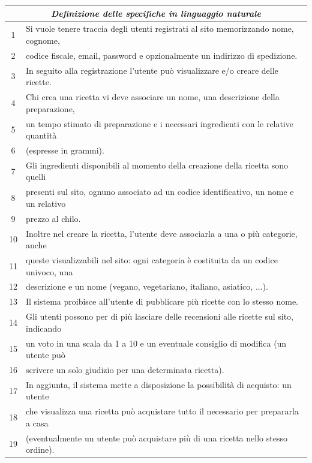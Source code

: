 \begin{table}[H]
\centering
\setlength{\extrarowheight}{2pt}
\begin{tabularx}{\textwidth}{|c|X|}
\hline
\multicolumn{2}{|c|}{\textit{\textbf{Definizione delle specifiche in linguaggio naturale}}} \\
\hline
1 & Si vuole tenere traccia degli utenti registrati al sito memorizzando nome, cognome,\\
2 & codice fiscale, email, password e opzionalmente un indirizzo di spedizione. \\
3 & In seguito alla registrazione l'utente può visualizzare e/o creare delle ricette. \\
4 & Chi crea una ricetta vi deve associare un nome, una descrizione della preparazione, \\
5 & un tempo stimato di preparazione e i necessari ingredienti con le relative quantità \\
6 & (espresse in grammi). \\
7 & Gli ingredienti disponibili al momento della creazione della ricetta sono quelli \\
8 & presenti sul sito, ognuno associato ad un codice identificativo, un nome e un relativo \\
9 & prezzo al chilo. \\
10 & Inoltre nel creare la ricetta, l'utente deve associarla a una o più categorie, anche \\
11 & queste visualizzabili nel sito: ogni categoria è costituita da un codice univoco, una \\
12 & descrizione e un nome (vegano, vegetariano, italiano, asiatico, ...). \\
13 & Il sistema proibisce all'utente di pubblicare più ricette con lo stesso nome. \\
14 & Gli utenti possono per di più lasciare delle recensioni alle ricette sul sito, indicando \\
15 & un voto in una scala da 1 a 10 e un eventuale consiglio di modifica (un utente può \\
16 & scrivere un solo giudizio per una determinata ricetta). \\
17 & In aggiunta, il sistema mette a disposizione la possibilità di acquisto: un utente \\
18 & che visualizza una ricetta può acquistare tutto il necessario per prepararla a casa \\
19 & (eventualmente un utente può acquistare più di una ricetta nello stesso ordine). \\

\end{tabularx}
\end{table}
